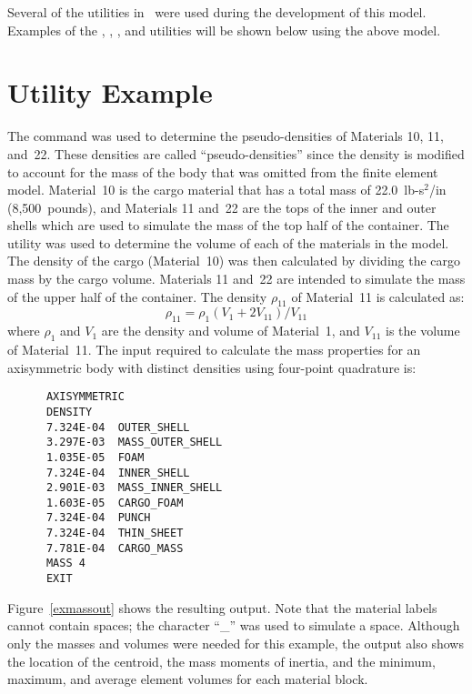 Several of the utilities in \numbers\ were used during the development
of this model.  Examples of the , ,
, and  utilities will be shown below using the
above model.  

\section{ Utility Example}
The  command was used to determine the
pseudo-densities of Materials 10, 11, and~22.  These densities are
called ``pseudo-densities'' since the density is modified to account for
the mass of the body that was omitted from the finite element model.
Material~10 is the cargo material that has a total mass of 22.0~lb-s$^2$/in
(8,500~pounds), and Materials 11 and~22 are the tops of the inner and
outer shells which are used to simulate the mass of the top half of the
container.  The  utility was used to determine the volume of
each of the materials in the model.  The density of the cargo
(Material~10) was then calculated by dividing the cargo mass by the
cargo volume.  Materials 11 and~22 are intended to simulate the mass of
the upper half of the container.  The density $\rho_{11}$ of Material~11
is calculated as: 
\begin{equation}
\rho_{11} = \rho_1 (V_1 + 2V_{11}) / V_{11}
\end{equation}
where $\rho_1$ and $V_1$ are the density and volume of Material~1, and
$V_{11}$ is the volume of Material~11.  The input required to calculate
the mass properties for an axisymmetric body with distinct densities
using four-point quadrature is:

\begin{verbatim}
      AXISYMMETRIC
      DENSITY
      7.324E-04  OUTER_SHELL     
      3.297E-03  MASS_OUTER_SHELL
      1.035E-05  FOAM            
      7.324E-04  INNER_SHELL     
      2.901E-03  MASS_INNER_SHELL
      1.603E-05  CARGO_FOAM      
      7.324E-04  PUNCH           
      7.324E-04  THIN_SHEET      
      7.781E-04  CARGO_MASS      
      MASS 4
      EXIT
\end{verbatim}

Figure~\ref{exmassout} shows the resulting output.  Note that the
material labels cannot contain spaces; the character ``\_'' was used to
simulate a space. Although only the masses and volumes were needed for
this example, the output also shows the location of the centroid, the
mass moments of inertia, and the minimum, maximum, and average element
volumes for each material block. 

